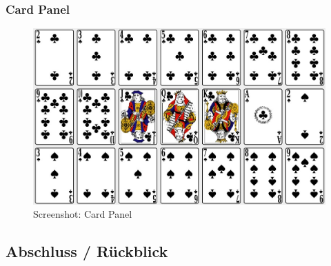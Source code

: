 \documentclass[a4paper,11pt]{article}
\begin{document}
\subsubsection{Card Panel}
\begin{figure}[H]
    \centering
    \includegraphics[width=.9\textwidth]{media/card-panel.jpg}
    \caption{Screenshot: Card Panel}
\end{figure}

\subsection{Abschluss / Rückblick}
\end{document}
